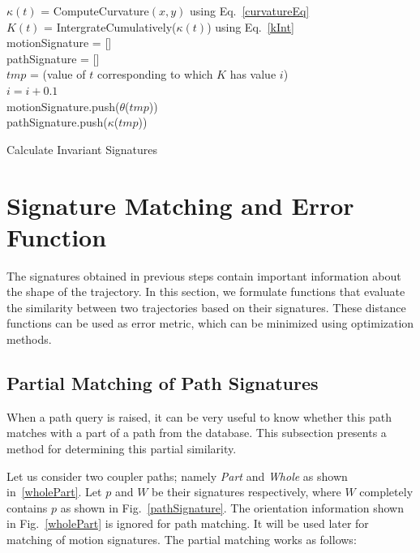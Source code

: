 \documentclass[twocolumn,10pt]{asme2ej}
\begin{document}
\begin{algorithm}
    $\kappa(t)$ = ComputeCurvature$(x, y)$ using Eq.~\ref{curvatureEq} \\
    $K(t)$ = IntergrateCumulatively($\kappa(t)$) using Eq.~\ref{kInt} \\
    motionSignature = [] \\
    pathSignature = [] \\
    {
      $tmp$ = (value of $t$ corresponding to which $K$ has value $i$) \\
      $i = i + 0.1$ \\
      motionSignature.push($\theta$($tmp$)) \\
      pathSignature.push($\kappa$($tmp$))
    }
    \caption{Calculate Invariant Signatures}
    \label{alg_signature}
\end{algorithm}

\section{Signature Matching and Error Function}\label{sec_distanceMetric}
The signatures obtained in previous steps contain important information about the shape of the trajectory.
In this section, we formulate functions that evaluate the similarity between two trajectories based on their signatures.
These distance functions can be used as error metric, which can be minimized using optimization methods.

\subsection{Partial Matching of Path Signatures}\label{sec_ncc}
When a path query is raised, it can be very useful to know whether this path matches with a part of a path from the database.
This subsection presents a method for determining this partial similarity.

Let us consider two coupler paths; namely \emph{Part} and \emph{Whole} as shown in~\ref{wholePart}.
Let $p$ and $W$ be their signatures respectively, where $W$ completely contains $p$ as shown in Fig.~\ref{pathSignature}.
The orientation information shown in Fig.~\ref{wholePart} is ignored for path matching. It will be used later for matching of motion signatures.
The partial matching works as follows:
\end{document}
